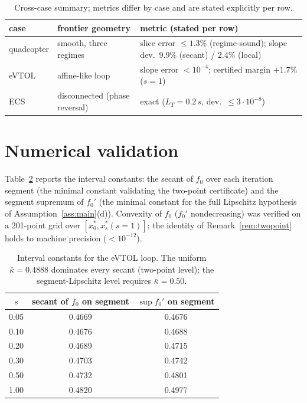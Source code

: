 \documentclass[11pt]{article}
\numberwithin{equation}{section}
\begin{document}
\begin{table}[htbp]
\centering
\begin{tabularx}{\textwidth}{ll X}
\toprule
case & frontier geometry & metric (stated per row) \\
\midrule
quadcopter & smooth, three regimes & slice error \(\le 1.3\%\) (regime-sound); slope dev.\ \(9.9\%\) (secant) / \(2.4\%\) (local) \\
eVTOL & affine-like loop & slope error \(<10^{-4}\); certified margin \(+1.7\%\) (\(s=1\)) \\
ECS & disconnected (phase reversal) & exact (\(L_T=0.2\,s\), dev.\ \(\le 3 \cdot 10^{-8}\)) \\
\bottomrule
\end{tabularx}
\caption{Cross-case summary; metrics differ by case and are stated explicitly per row.}
\label{tab:cases}
\end{table}

\section{Numerical validation}\label{sec:validation}
Table~\ref{tab:kappa} reports the interval constants: the secant of $f_0$ over
each iteration segment (the minimal constant validating the two-point
certificate) and the segment supremum of $f_0'$ (the minimal constant for the
full Lipschitz hypothesis of Assumption~\ref{ass:main}(d)). Convexity of $f_0$
($f_0'$ nondecreasing) was verified on a 201-point grid over
$[x_0^*,x_s^*(s{=}1)]$; the identity of Remark~\ref{rem:twopoint} holds to
machine precision ($<10^{-12}$).



\begin{table}[h]
\centering
\begin{tabular}{ccc}
\toprule
$s$ & secant of $f_0$ on segment & $\sup f_0'$ on segment \\
\midrule
0.05 & 0.4669 & 0.4676 \\
0.10 & 0.4676 & 0.4688 \\
0.20 & 0.4689 & 0.4715 \\
0.30 & 0.4703 & 0.4742 \\
0.50 & 0.4732 & 0.4801 \\
1.00 & 0.4820 & 0.4977 \\
\bottomrule
\end{tabular}
\caption{Interval constants for the eVTOL loop. The uniform
$\bar\kappa=0.4888$ dominates every secant (two-point level); the
segment-Lipschitz level requires $\bar\kappa=0.50$.}
\label{tab:kappa}
\end{table}
\end{document}
